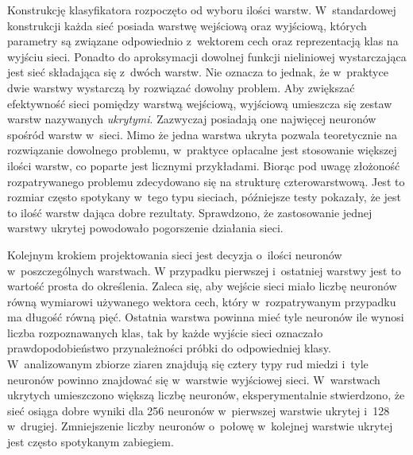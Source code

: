 Konstrukcję klasyfikatora rozpoczęto od wyboru ilości warstw.
W~standardowej konstrukcji każda sieć posiada warstwę wejściową oraz
wyjściową, których parametry są związane odpowiednio z~wektorem cech
oraz reprezentacją klas na wyjściu sieci.
Ponadto do aproksymacji dowolnej funkcji nieliniowej wystarczająca jest sieć
składająca się z~dwóch warstw.
Nie oznacza to jednak, że w~praktyce dwie warstwy wystarczą by rozwiązać
dowolny problem.
Aby zwiększać efektywność sieci pomiędzy warstwą wejściową, wyjściową
umieszcza się zestaw warstw nazywanych \emph{ukrytymi}.
Zazwyczaj posiadają one najwięcej neuronów spośród warstw w~sieci.
Mimo że jedna warstwa ukryta pozwala teoretycznie na rozwiązanie dowolnego
problemu, w~praktyce opłacalne jest stosowanie większej ilości warstw,
co poparte jest licznymi przykładami\cite{reed}.
Biorąc pod uwagę złożoność rozpatrywanego problemu zdecydowano się na
strukturę czterowarstwową.
Jest to rozmiar często spotykany w~tego typu sieciach, późniejsze testy
pokazały, że jest to ilość warstw dająca dobre rezultaty.
Sprawdzono, że zastosowanie jednej warstwy ukrytej powodowało pogorszenie
działania sieci.

Kolejnym krokiem projektowania sieci jest decyzja o~ilości neuronów
w~poszczególnych warstwach.
W przypadku pierwszej i~ostatniej warstwy jest to wartość prosta do
określenia.
Zaleca się, aby wejście sieci miało liczbę neuronów równą wymiarowi
używanego wektora cech, który w~rozpatrywanym przypadku ma długość równą pięć.
Ostatnia warstwa powinna mieć tyle neuronów ile wynosi liczba rozpoznawanych
klas, tak by każde wyjście sieci oznaczało prawdopodobieństwo przynależności
próbki do odpowiedniej klasy.
W~analizowanym zbiorze ziaren znajdują się cztery typy rud miedzi i~tyle
neuronów powinno znajdować się w~warstwie wyjściowej sieci.
W~warstwach ukrytych umieszczono większą liczbę neuronów, eksperymentalnie
stwierdzono, że sieć osiąga dobre wyniki dla 256 neuronów w~pierwszej
warstwie ukrytej i~128 w~drugiej.
Zmniejszenie liczby neuronów o~połowę w~kolejnej warstwie ukrytej jest
często spotykanym zabiegiem.

